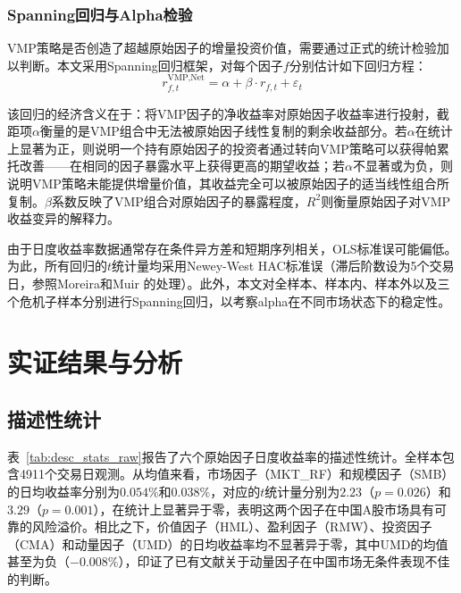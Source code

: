 \documentclass[
    decl-page,
    oneside,
  ]{njuthesis}
\begin{document}
\subsection{Spanning回归与Alpha检验}

VMP策略是否创造了超越原始因子的增量投资价值，需要通过正式的统计检验加以判断。本文采用Spanning回归框架，对每个因子$f$分别估计如下回归方程：
\begin{equation}
  r_{f,t}^{\text{VMP,Net}} = \alpha + \beta \cdot r_{f,t} + \varepsilon_t
  \label{eq:Spanning}
\end{equation}

该回归的经济含义在于：将VMP因子的净收益率对原始因子收益率进行投射，截距项$\alpha$衡量的是VMP组合中无法被原始因子线性复制的剩余收益部分。若$\alpha$在统计上显著为正，则说明一个持有原始因子的投资者通过转向VMP策略可以获得帕累托改善——在相同的因子暴露水平上获得更高的期望收益；若$\alpha$不显著或为负，则说明VMP策略未能提供增量价值，其收益完全可以被原始因子的适当线性组合所复制。$\beta$系数反映了VMP组合对原始因子的暴露程度，$R^2$则衡量原始因子对VMP收益变异的解释力。

由于日度收益率数据通常存在条件异方差和短期序列相关，OLS标准误可能偏低。为此，所有回归的$t$统计量均采用Newey-West \cite{newey1987simple} HAC标准误（滞后阶数设为5个交易日，参照Moreira和Muir \cite{moreira2017volatility} 的处理）。此外，本文对全样本、样本内、样本外以及三个危机子样本分别进行Spanning回归，以考察alpha在不同市场状态下的稳定性。


\chapter{实证结果与分析}

\section{描述性统计}

表~\ref{tab:desc_stats_raw}报告了六个原始因子日度收益率的描述性统计。全样本包含4911个交易日观测。从均值来看，市场因子（MKT\_RF）和规模因子（SMB）的日均收益率分别为$0.054\%$和$0.038\%$，对应的$t$统计量分别为$2.23$（$p=0.026$）和$3.29$（$p=0.001$），在统计上显著异于零，表明这两个因子在中国A股市场具有可靠的风险溢价。相比之下，价值因子（HML）、盈利因子（RMW）、投资因子（CMA）和动量因子（UMD）的日均收益率均不显著异于零，其中UMD的均值甚至为负（$-0.008\%$），印证了已有文献关于动量因子在中国市场无条件表现不佳的判断。
\end{document}
